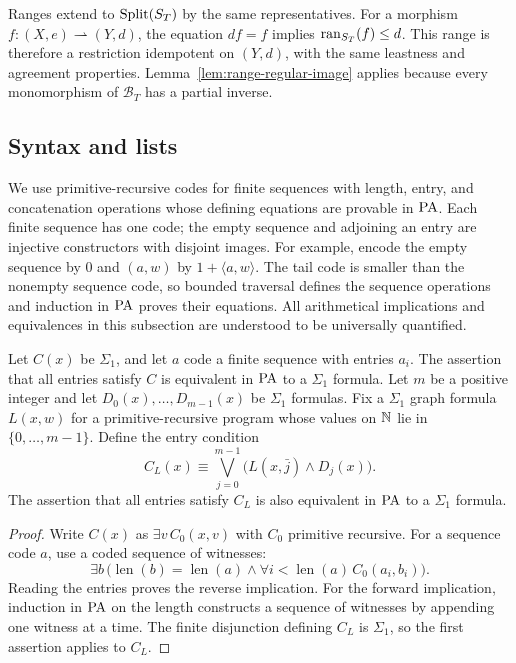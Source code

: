 Ranges extend to $\operatorname{Split}(S_T)$ by the same representatives.
For a morphism $f:(X,e)\rightharpoonup(Y,d)$, the equation
$df=f$ implies $\operatorname{ran}_{S_T}(f)\leq d$. This range is therefore
a restriction idempotent on $(Y,d)$, with the same leastness
and agreement properties. Lemma~\ref{lem:range-regular-image}
applies because every monomorphism of $\mathcal B_T$ has a
partial inverse.

\subsection{Syntax and lists}
\label{sec:st-parameterized-syntax}

We use primitive-recursive codes for finite sequences with length,
entry, and concatenation operations whose defining equations are
provable in $\mathrm{PA}$. Each finite sequence has one code; the empty
sequence and adjoining an entry are injective constructors with
disjoint images. For example, encode the empty sequence by $0$
and $(a,w)$ by $1+\langle a,w\rangle$. The tail code is smaller
than the nonempty sequence code, so bounded traversal defines the
sequence operations and induction in $\mathrm{PA}$ proves their equations.
All arithmetical implications and equivalences in this subsection
are understood to be universally quantified.

\begin{lemma}
\label{lem:st-finite-sigma1}
Let $C(x)$ be $\Sigma_1$, and let $a$ code a finite sequence with
entries $a_i$. The assertion that all entries satisfy $C$ is equivalent
in $\mathrm{PA}$ to a $\Sigma_1$ formula. Let $m$ be a positive integer and let
$D_0(x),\ldots,D_{m-1}(x)$ be $\Sigma_1$ formulas. Fix a $\Sigma_1$
graph formula $L(x,w)$ for a primitive-recursive program whose values on
$\mathbb N$ lie in $\{0,\ldots,m-1\}$. Define the entry condition
\[
 C_L(x)\equiv\bigvee_{j=0}^{m-1}\bigl(L(x,\bar j)\land D_j(x)\bigr).
\]
The assertion that all entries satisfy $C_L$ is also equivalent in $\mathrm{PA}$
to a $\Sigma_1$ formula.
\end{lemma}
\begin{proof}
Write $C(x)$ as $\exists v\,C_0(x,v)$ with $C_0$ primitive recursive.
For a sequence code $a$, use a coded sequence of witnesses:
\[
 \exists b\,\bigl(\operatorname{len}(b)=\operatorname{len}(a)
   \land\forall i<\operatorname{len}(a)\,
                  C_0(a_i,b_i)\bigr).
\]
Reading the entries proves the reverse implication. For the forward implication,
induction in $\mathrm{PA}$ on the length constructs a sequence of witnesses by
appending one witness at a time.
The finite disjunction defining $C_L$ is $\Sigma_1$, so the first
assertion applies to $C_L$.
\end{proof}

